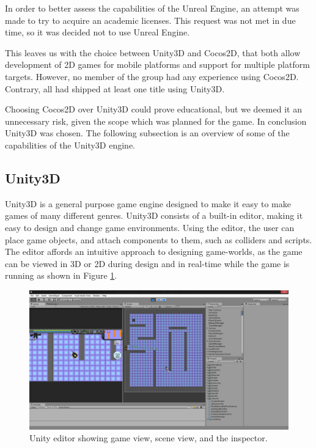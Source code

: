 In order to better assess the capabilities of the Unreal Engine, an attempt was made to try to acquire an academic licenses.
This request was not met in due time, so it was decided not to use Unreal Engine.

This leaves us with the choice between Unity3D and Cocos2D, that both allow development of 2D games for mobile platforms and support for multiple platform targets.
However, no member of the group had any experience using Cocos2D.
Contrary, all had shipped at least one title using Unity3D.

Choosing Cocos2D over Unity3D could prove educational, but we deemed it an unnecessary risk, given the scope which was planned for the game.
In conclusion Unity3D was chosen. The following subsection is an overview of some of the capabilities of the Unity3D engine.

\subsection{Unity3D}
Unity3D is a general purpose game engine designed to make it easy to make games
of many different genres. Unity3D consists of a built-in editor, making it
easy to design and change game environments. Using the editor, the user can
place game objects, and attach components to them, such as colliders and
scripts. The editor affords an intuitive approach to designing game-worlds, as
the game can be viewed in 3D or 2D during design and in real-time while the
game is running as shown in Figure \ref{platform:editor}.

\begin{figure}[H]
\begin{center}
	\includegraphics[width=\textwidth]{figures/architecture/editor.png}
	\caption{Unity editor showing game view, scene view, and the inspector.}
	\label{platform:editor}
\end{center}
\end{figure}

